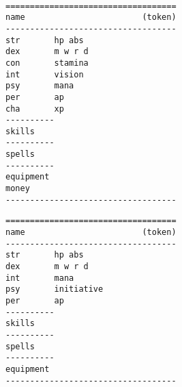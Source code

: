 
\

\noindent
\begin{center}
\begin{minipage}[t]{0.45\textwidth}                   %
\small \begin{verbatim}
===================================
name                        (token)
-----------------------------------
str       hp abs
dex       m w r d
con       stamina
int       vision
psy       mana
per       ap
cha       xp
----------
skills
----------
spells
----------
equipment
money
-----------------------------------
\end{verbatim} \normalsize
\end{minipage}
\hfill  %
\begin{minipage}[t]{0.45\textwidth}                   %
\small \begin{verbatim}
===================================
name                        (token)
-----------------------------------
str       hp abs
dex       m w r d
int       mana
psy       initiative
per       ap
----------
skills
----------
spells
----------
equipment
-----------------------------------
\end{verbatim} \normalsize
\end{minipage}
\end{center}


\vspace{2.0\baselineskip}


